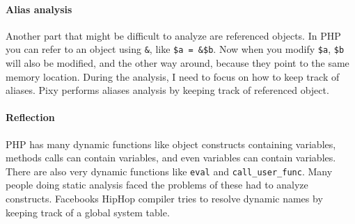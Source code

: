 \documentclass[../main.tex]{subfiles}
\begin{document}
\paragraph{Alias analysis}
\label{alias}
Another part that might be difficult to analyze are referenced objects.
In PHP you can refer to an object using \texttt{\&}, like \texttt{\$a = \&\$b}.
Now when you modify \texttt{\$a}, \texttt{\$b} will also be modified, and the other way around, because they point to the same memory location.
During the analysis, I need to focus on how to keep track of aliases. 
Pixy \autocite{Jov:06} performs aliases analysis by keeping track of referenced object.

\paragraph{Reflection}
\label{reflection}
PHP has many dynamic functions like object constructs containing variables, methods calls can contain variables, and even variables can contain variables.
There are also very dynamic functions like \texttt{eval} and \texttt{call\_user\_func}.
Many people doing static analysis faced the problems of these had to analyze constructs.
Facebooks HipHop compiler \autocite{Zha:12} tries to resolve dynamic names by keeping track of a global system table.
\end{document}
